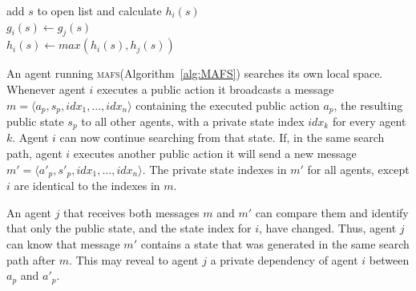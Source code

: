 \documentclass{article}
\newcommand{\mafs}{\textsc {mafs}\xspace}
\theoremstyle{remark}
\begin{document}
\begin{algorithm}[b!]
{			 { 
				add $s$ to open list and calculate $h_{i}(s)$ \label{line:local-h}\\
				$g_{i}(s)\leftarrow g_{j}(s)$\\
				$h_{i}(s)\leftarrow max(h_{i}(s), h_{j}(s))$\label{line:update-h}\\
			}
		}
		\label{alg:expand}
	\end{algorithm}


An agent running \mafs (Algorithm~\ref{alg:MAFS}) searches its own local space. Whenever agent $i$ executes a public action it broadcasts a message $m=\langle a_p, s_p, idx_1, ..., idx_n \rangle$ containing the executed public action $a_p$, the resulting public state $s_p$ to all other agents, with a private state index $idx_k$ for every agent $k$. Agent $i$ can now continue searching from that state. If, in the same search path, agent $i$ executes another public action it will send a new message $m'=\langle a'_p, s'_p, idx_1, ..., idx_n \rangle$. The private state indexes in $m'$ for all agents, except $i$ are identical to the indexes in $m$.

An agent $j$ that receives both messages $m$ and $m'$ can compare them and identify that only the public state, and the state index for $i$, have changed. Thus, agent $j$ can know that message $m'$ contains a state that was generated in the same search path after $m$. This may reveal to agent $j$ a private dependency of agent $i$ between $a_p$ and $a'_p$.
\end{document}
